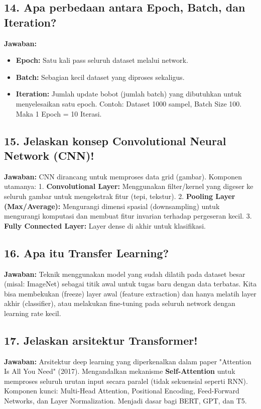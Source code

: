 \subsection{14. Apa perbedaan antara Epoch, Batch, dan Iteration?}
\textbf{Jawaban:}
\begin{itemize}
    \item \textbf{Epoch:} Satu kali pass seluruh dataset melalui network.
    \item \textbf{Batch:} Sebagian kecil dataset yang diproses sekaligus.
    \item \textbf{Iteration:} Jumlah update bobot (jumlah batch) yang dibutuhkan untuk menyelesaikan satu epoch.
    Contoh: Dataset 1000 sampel, Batch Size 100. Maka 1 Epoch = 10 Iterasi.
\end{itemize}

\subsection{15. Jelaskan konsep Convolutional Neural Network (CNN)!}
\textbf{Jawaban:}
CNN dirancang untuk memproses data grid (gambar). Komponen utamanya:
1. \textbf{Convolutional Layer:} Menggunakan filter/kernel yang digeser ke seluruh gambar untuk mengekstrak fitur (tepi, tekstur).
2. \textbf{Pooling Layer (Max/Average):} Mengurangi dimensi spasial (downsampling) untuk mengurangi komputasi dan membuat fitur invarian terhadap pergeseran kecil.
3. \textbf{Fully Connected Layer:} Layer dense di akhir untuk klasifikasi.

\subsection{16. Apa itu Transfer Learning?}
\textbf{Jawaban:}
Teknik menggunakan model yang sudah dilatih pada dataset besar (misal: ImageNet) sebagai titik awal untuk tugas baru dengan data terbatas.
Kita bisa membekukan (freeze) layer awal (feature extraction) dan hanya melatih layer akhir (classifier), atau melakukan fine-tuning pada seluruh network dengan learning rate kecil.

\subsection{17. Jelaskan arsitektur Transformer!}
\textbf{Jawaban:}
Arsitektur deep learning yang diperkenalkan dalam paper "Attention Is All You Need" (2017). Mengandalkan mekanisme \textbf{Self-Attention} untuk memproses seluruh urutan input secara paralel (tidak sekuensial seperti RNN).
Komponen kunci: Multi-Head Attention, Positional Encoding, Feed-Forward Networks, dan Layer Normalization. Menjadi dasar bagi BERT, GPT, dan T5.

